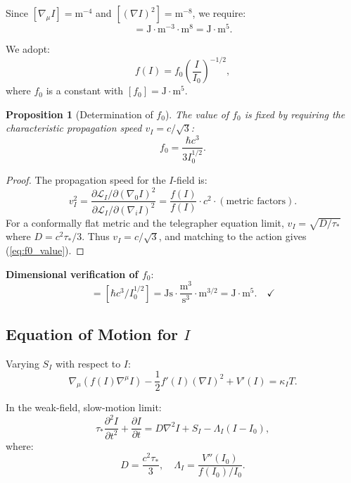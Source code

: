 \documentclass[12pt, a4paper]{article}
\newtheorem{proposition}{Proposition}
\begin{document}
Since $[\nabla_\mu I] = \text{m}^{-4}$ and $[(\nabla I)^2] = \text{m}^{-8}$, we require:
\begin{equation}
    [f(I)] = \text{J} \cdot \text{m}^{-3} \cdot \text{m}^{8} = \text{J} \cdot \text{m}^{5}.
\end{equation}

We adopt:
\begin{equation}
    f(I) = f_0 \left(\frac{I}{I_0}\right)^{-1/2},
    \label{eq:f_I}
\end{equation}
where $f_0$ is a constant with $[f_0] = \text{J} \cdot \text{m}^5$.

\begin{proposition}[Determination of $f_0$]
The value of $f_0$ is fixed by requiring the characteristic propagation speed $v_I = c/\sqrt{3}$:
\begin{equation}
    f_0 = \frac{\hbar c^3}{3 I_0^{1/2}}.
    \label{eq:f0_value}
\end{equation}
\end{proposition}

\begin{proof}
The propagation speed for the $I$-field is:
\[
    v_I^2 = \frac{\partial \mathcal{L}_I / \partial (\nabla_0 I)^2}{\partial \mathcal{L}_I / \partial (\nabla_i I)^2} = \frac{f(I)}{f(I)} \cdot c^2 \cdot (\text{metric factors}).
\]
For a conformally flat metric and the telegrapher equation limit, $v_I = \sqrt{D/\tau_*}$ where $D = c^2\tau_*/3$. Thus $v_I = c/\sqrt{3}$, and matching to the action gives (\ref{eq:f0_value}).
\end{proof}

\textbf{Dimensional verification of $f_0$}:
\begin{equation}
    [f_0] = [\hbar c^3 / I_0^{1/2}] = \text{Js} \cdot \frac{\text{m}^3}{\text{s}^3} \cdot \text{m}^{3/2} = \text{J} \cdot \text{m}^{5}. \quad \checkmark
\end{equation}

\subsection{Equation of Motion for $I$}

Varying $S_I$ with respect to $I$:
\begin{equation}
    \nabla_\mu \left( f(I) \nabla^\mu I \right) - \frac{1}{2} f'(I) (\nabla I)^2 + V'(I) = \kappa_I T.
    \label{eq:I_EOM_covariant}
\end{equation}

In the weak-field, slow-motion limit:
\begin{equation}
    \tau_* \frac{\partial^2 I}{\partial t^2} + \frac{\partial I}{\partial t} = D \nabla^2 I + S_I - \Lambda_I (I - I_0),
    \label{eq:I_EOM_31}
\end{equation}
where:
\begin{equation}
    D = \frac{c^2 \tau_*}{3}, \quad \Lambda_I = \frac{V''(I_0)}{f(I_0)/I_0}.
\end{equation}
\end{document}
